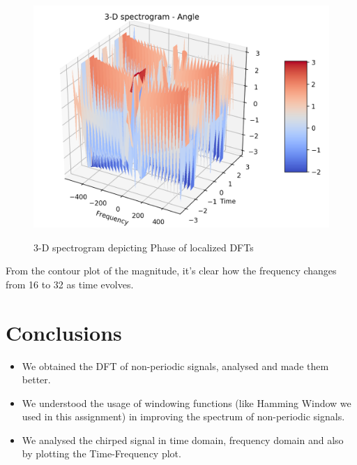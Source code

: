 \documentclass[11pt, a4paper]{article}
\begin{document}
\begin{figure}[H]
   	\centering
   	\includegraphics[scale=0.5]{qn6_ang.png}
   	\label{fig:qn6_ang}
   	\caption{3-D spectrogram depicting Phase of localized DFTs}
\end{figure}
{
From the contour plot of the magnitude, it's clear how the frequency changes from 16 to 32 as time evolves.
}


\section{Conclusions}
\begin{itemize}
\item We obtained the DFT of non-periodic signals, analysed and made them better.
\item We understood the usage of windowing functions (like Hamming Window we used in this assignment) in improving the spectrum of non-periodic signals.
\item We analysed the chirped signal in time domain, frequency domain and also by plotting the Time-Frequency plot.
\end{itemize}
\end{document}
